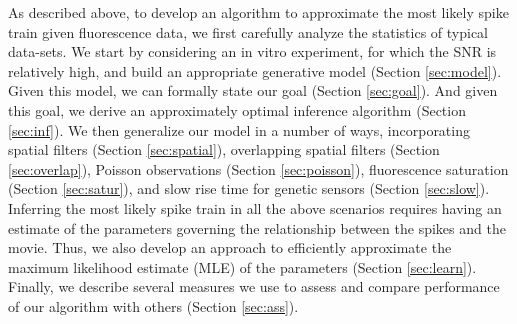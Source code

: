 As described above, to develop an algorithm to approximate the most likely spike train given fluorescence data, we first carefully analyze the statistics of typical data-sets.  We start by considering an in vitro experiment, for which the SNR is relatively high, and build an appropriate generative model (Section \ref{sec:model}).  Given this model, we can formally state our goal (Section \ref{sec:goal}).  And given this goal, we derive an approximately optimal inference algorithm (Section \ref{sec:inf}).  We then generalize our model in a number of ways, incorporating spatial filters (Section \ref{sec:spatial}), overlapping spatial filters (Section \ref{sec:overlap}), Poisson observations (Section \ref{sec:poisson}), fluorescence saturation (Section \ref{sec:satur}), and slow rise time for genetic sensors (Section \ref{sec:slow}).  Inferring the most likely spike train in all the above scenarios requires having an estimate of the parameters governing the relationship between the spikes and the movie.  Thus, we also develop an approach to efficiently approximate the maximum likelihood estimate (MLE) of the parameters (Section \ref{sec:learn}).  Finally, we describe several measures we use to assess and compare performance of our algorithm with others (Section \ref{sec:ass}).    